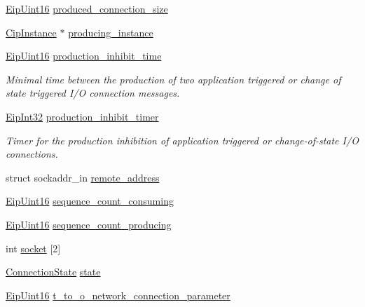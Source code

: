 \begin{DoxyCompactItemize}
\item 
\hyperlink{typedefs_8h_ac1b4cfa25b4f5def62f23b455dd395d8}{\-Eip\-Uint16} \hyperlink{structconnection__object_a06f2c634d47a6b2883821737aff5ec03}{produced\-\_\-connection\-\_\-size}
\item 
\hyperlink{ciptypes_8h_aea7976be629e5ece275c993982186188}{\-Cip\-Instance} $\ast$ \hyperlink{structconnection__object_ab486fb828cb85f57c53abea69ad9faff}{producing\-\_\-instance}
\item 
\hyperlink{typedefs_8h_ac1b4cfa25b4f5def62f23b455dd395d8}{\-Eip\-Uint16} \hyperlink{structconnection__object_ad0ebc379aa4dc0d0c8d26ef8e3d7f3a8}{production\-\_\-inhibit\-\_\-time}
\begin{DoxyCompactList}\small\item\em \-Minimal time between the production of two application triggered or change of state triggered \-I/\-O connection messages. \end{DoxyCompactList}\item 
\hyperlink{typedefs_8h_a3d850c4594f24c4fa1f1782e1034ee71}{\-Eip\-Int32} \hyperlink{structconnection__object_a778d093e5752c80e5b7c043541054641}{production\-\_\-inhibit\-\_\-timer}
\begin{DoxyCompactList}\small\item\em \-Timer for the production inhibition of application triggered or change-\/of-\/state \-I/\-O connections. \end{DoxyCompactList}\item 
struct sockaddr\-\_\-in \hyperlink{structconnection__object_a32b8fe01a538f765d0cce564f705c2ea}{remote\-\_\-address}
\item 
\hyperlink{typedefs_8h_ac1b4cfa25b4f5def62f23b455dd395d8}{\-Eip\-Uint16} \hyperlink{structconnection__object_ad6c06f4b33c7bea685145806c86d2c3f}{sequence\-\_\-count\-\_\-consuming}
\item 
\hyperlink{typedefs_8h_ac1b4cfa25b4f5def62f23b455dd395d8}{\-Eip\-Uint16} \hyperlink{structconnection__object_a3bdc60cec812eb1fa09d731971c28c59}{sequence\-\_\-count\-\_\-producing}
\item 
int \hyperlink{structconnection__object_af79cffac5d391cb48b836dca8b893fe4}{socket} \mbox{[}2\mbox{]}
\item 
\hyperlink{cipconnectionmanager_8h_acdd867d72142510ce53521a63a062f9b}{\-Connection\-State} \hyperlink{structconnection__object_a07b0290442443753728fe18cc6a756a4}{state}
\item 
\hyperlink{typedefs_8h_ac1b4cfa25b4f5def62f23b455dd395d8}{\-Eip\-Uint16} \hyperlink{structconnection__object_a8ccf723e8dce62eb578a046fd35a774f}{t\-\_\-to\-\_\-o\-\_\-network\-\_\-connection\-\_\-parameter}

\end{DoxyCompactItemize}
